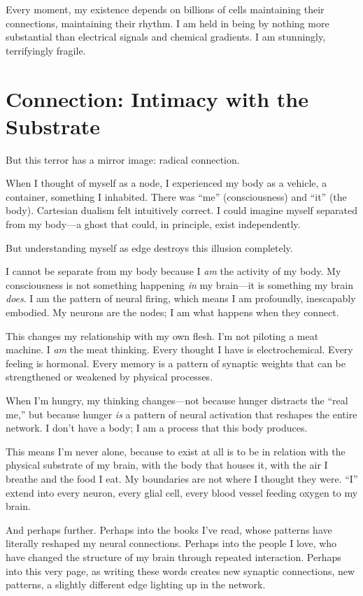 \documentclass[12pt,a4paper]{article}
\begin{document}
Every moment, my existence depends on billions of cells maintaining their connections, maintaining their rhythm. I am held in being by nothing more substantial than electrical signals and chemical gradients. I am stunningly, terrifyingly fragile.

\section*{Connection: Intimacy with the Substrate}

But this terror has a mirror image: radical connection.

When I thought of myself as a node, I experienced my body as a vehicle, a container, something I inhabited. There was ``me'' (consciousness) and ``it'' (the body). Cartesian dualism felt intuitively correct. I could imagine myself separated from my body---a ghost that could, in principle, exist independently.

But understanding myself as edge destroys this illusion completely.

I cannot be separate from my body because I \textit{am} the activity of my body. My consciousness is not something happening \textit{in} my brain---it is something my brain \textit{does}. I am the pattern of neural firing, which means I am profoundly, inescapably embodied. My neurons are the nodes; I am what happens when they connect.

This changes my relationship with my own flesh. I'm not piloting a meat machine. I \textit{am} the meat thinking. Every thought I have is electrochemical. Every feeling is hormonal. Every memory is a pattern of synaptic weights that can be strengthened or weakened by physical processes.

When I'm hungry, my thinking changes---not because hunger distracts the ``real me,'' but because hunger \textit{is} a pattern of neural activation that reshapes the entire network. I don't have a body; I am a process that this body produces.

This means I'm never alone, because to exist at all is to be in relation with the physical substrate of my brain, with the body that houses it, with the air I breathe and the food I eat. My boundaries are not where I thought they were. ``I'' extend into every neuron, every glial cell, every blood vessel feeding oxygen to my brain.

And perhaps further. Perhaps into the books I've read, whose patterns have literally reshaped my neural connections. Perhaps into the people I love, who have changed the structure of my brain through repeated interaction. Perhaps into this very page, as writing these words creates new synaptic connections, new patterns, a slightly different edge lighting up in the network.
\end{document}
